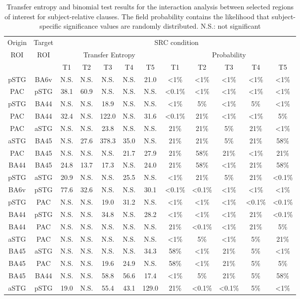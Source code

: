 \vspace{5mm}

\begin{table}[h]
\begin{center}
\begin{tabular}{cccccccccccc}
Origin & Target & \multicolumn{10}{c}{SRC condition}\\
ROI & ROI & \multicolumn{5}{c}{Transfer Entropy} & \multicolumn{5}{c}{Probability}\\
 & & T1 & T2 & T3 & T4 & \multicolumn{1}{c|}{T5} & T1 & T2 & T3 & T4 & T5\\ \hline
pSTG & BA6v & N.S. & N.S. & N.S. & N.S. & 21.0 & <1\% & <1\% & <1\% & <1\% & <1\%\\ 
PAC & pSTG & 38.1 & 60.9 & N.S. & N.S. & N.S. & <0.1\% & <1\% & <1\% & <1\% & <1\%\\ 
pSTG & BA44 & N.S. & N.S. & 18.9 & N.S. & N.S. & <1\% & 5\% & <1\% & 5\% & <1\%\\ 
PAC & BA44 & 32.4 & N.S. & 122.0 & N.S. & 31.6 & <0.1\% & 21\% & <1\% & <1\% & 5\%\\ 
PAC & aSTG & N.S. & N.S. & 23.8 & N.S. & N.S. & 21\% & 21\% & 5\% & 21\% & <1\%\\ 
aSTG & BA45 & N.S. & 27.6 & 378.3 & 35.0 & N.S. & 21\% & 21\% & 5\% & 21\% & 58\%\\ 
PAC & BA45 & N.S. & N.S. & N.S. & 21.7 & 27.9 & 21\% & 58\% & 21\% & <1\% & 21\%\\ 
BA44 & BA45 & 24.8 & 13.7 & 17.3 & N.S. & 24.0 & 21\% & 58\% & <1\% & 21\% & 58\%\\ 
pSTG & aSTG & 20.9 & N.S. & N.S. & 25.5 & N.S. & <1\% & 21\% & 5\% & 21\% & <0.1\%\\ 
BA6v & pSTG & 77.6 & 32.6 & N.S. & N.S. & 30.1 & <0.1\% & <0.1\% & <1\% & <1\% & <1\%\\ 
pSTG & PAC & N.S. & N.S. & 19.0 & 31.2 & N.S. & <1\% & <1\% & <1\% & <0.1\% & <0.1\%\\ 
BA44 & pSTG & N.S. & N.S. & 34.8 & N.S. & 28.2 & <1\% & <1\% & <1\% & 21\% & <0.1\%\\ 
BA44 & PAC & N.S. & N.S. & N.S. & N.S. & N.S. & 21\% & <0.1\% & <1\% & 21\% & 5\%\\ 
aSTG & PAC & N.S. & N.S. & N.S. & N.S. & N.S. & <1\% & 5\% & <1\% & 5\% & 21\%\\ 
BA45 & aSTG & N.S. & N.S. & N.S. & N.S. & 34.3 & 58\% & <1\% & 21\% & 5\% & <1\%\\ 
BA45 & PAC & N.S. & N.S. & 19.6 & 24.9 & N.S. & 58\% & <1\% & 21\% & 5\% & 5\%\\ 
BA45 & BA44 & N.S. & N.S. & 58.8 & 56.6 & 17.4 & <1\% & 5\% & 21\% & 5\% & 58\%\\ 
aSTG & pSTG & 19.0 & N.S. & 55.4 & 43.1 & 129.0 & 21\% & <0.1\% & <0.1\% & 5\% & <1\%\\ 
\end{tabular}
\caption{\label{4.4.TEvalues.b} Transfer entropy and binomial test results for the interaction analysis between selected regions of interest for subject-relative clauses. The field probability contains the likelihood that subject-specific significance values are randomly distributed. N.S.: not significant}
\end{center}
\end{table}
